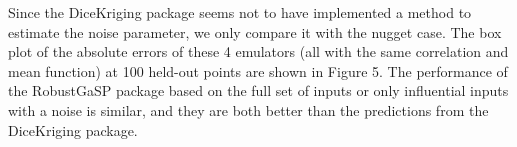\documentclass[
  10pt,
]{article}
\begin{document}
Since the DiceKriging package seems not to have implemented a method to
estimate the noise parameter, we only compare it with the nugget case.
The box plot of the absolute errors of these 4 emulators (all with the
same correlation and mean function) at 100 held-out points are shown in
Figure 5. The performance of the RobustGaSP package based on the full
set of inputs or only influential inputs with a noise is similar, and
they are both better than the predictions from the DiceKriging package.
\end{document}
